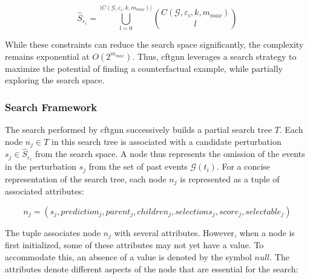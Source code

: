 \begin{equation}
    \hat{S}_{\varepsilon_i} = \bigcup_{l = 0}^{|C(\mathcal{G}, \varepsilon_i, k, m_{max})|} {C(\mathcal{G}, \varepsilon_i, k, m_{max}) \choose l}
\end{equation}

While these constraints can reduce the search space significantly, the complexity remains exponential at $O(2^{m_{max}})$. Thus, \gls{cftgnn} leverages a search strategy to maximize the potential of finding a counterfactual example, while partially exploring the search space.

\subsubsection{Search Framework}
\label{s_Methodology_Overview_Search}

The search performed by \gls{cftgnn} successively builds a partial search tree $T$. Each node $n_j \in T$ in this search tree is associated with a candidate perturbation $s_j \in \hat{S}_{\varepsilon_i}$ from the search space. A node thus represents the omission of the events in the perturbation $s_j$ from the set of past events $\mathcal{G}(t_i)$. For a concise representation of the search tree, each node $n_j$ is represented as a tuple of associated attributes:

\begin{equation}
    n_j = (s_j, prediction_j, parent_j, children_j, selections_j, score_j, selectable_j)
\end{equation}

The tuple associates node $n_j$ with several attributes. However, when a node is first initialized, some of these attributes may not yet have a value. To accommodate this, an absence of a value is denoted by the symbol $null$. The attributes denote different aspects of the node that are essential for the search:

